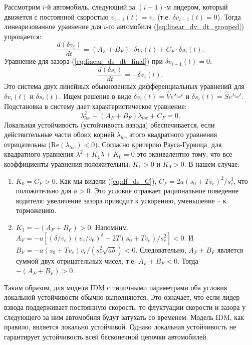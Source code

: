 \documentclass[12pt, a4paper]{article}
\begin{document}
Рассмотрим $i$-й автомобиль, следующий за $(i-1)$-м лидером, который движется с постоянной скоростью $v_{i-1}(t) = v_e$ (т.е. $\delta v_{i-1}(t) = 0$).
Тогда линеаризованное уравнение для $i$-го автомобиля (\ref{eq:linear_dv_dt_grouped}) упрощается:
\begin{equation}
\label{eq:local_dv_dt}
\frac{d(\delta v_i)}{dt} = (A_F + B_F) \cdot \delta v_i(t) + C_F \cdot \delta s_i(t).
\end{equation}
Уравнение для зазора (\ref{eq:linear_ds_dt_final}) при $\delta v_{i-1}(t)=0$:
\begin{equation}
\label{eq:local_ds_dt}
\frac{d(\delta s_i)}{dt} = - \delta v_i(t).
\end{equation}
Это система двух линейных обыкновенных дифференциальных уравнений для $\delta v_i(t)$ и $\delta s_i(t)$.
Ищем решение в виде $\delta v_i(t) = \hat{V} e^{\lambda_{loc} t}$ и $\delta s_i(t) = \hat{S} e^{\lambda_{loc} t}$.
Подстановка в систему дает характеристическое уравнение:
\[ \lambda_{loc}^2 - (A_F + B_F) \lambda_{loc} + C_F = 0. \]
Локальная устойчивость (устойчивость взвода) обеспечивается, если действительные части обоих корней $\lambda_{loc}$ этого квадратного уравнения отрицательны ($\text{Re}(\lambda_{loc}) < 0$). Согласно критерию Рауса-Гурвица, для квадратного уравнения $\lambda^2 + K_1 \lambda + K_0 = 0$ это эквивалентно тому, что все коэффициенты уравнения положительны: $K_1 > 0$ и $K_0 > 0$.
В нашем случае:
\begin{enumerate}
    \item $K_0 = C_F > 0$. Как мы видели (\ref{eq:df_ds_C}), $C_F = 2a (s_0+Tv_e)^2/s_e^3$, что положительно для $a>0$. Это условие отражает рациональное поведение водителя: увеличение зазора приводит к ускорению, уменьшение – к торможению.
    \item $K_1 = -(A_F + B_F) > 0$.
    Напомним, $A_F = -a [ (\delta/v_e)(v_e/v_0)^\delta + 2T(s_0+Tv_e)/s_e^2 ] < 0$.
    И $B_F = -a (s_0+Tv_e)v_e/(s_e^2 \sqrt{ab}) < 0$.
    Следовательно, $A_F + B_F$ является суммой двух отрицательных чисел, т.е. $A_F+B_F < 0$.
    Тогда $-(A_F+B_F) > 0$.
\end{enumerate}
Таким образом, для модели IDM с типичными параметрами оба условия локальной устойчивости обычно выполняются. Это означает, что если лидер взвода поддерживает постоянную скорость, то флуктуации скорости и зазора у следующего за ним автомобиля будут затухать со временем. Модель IDM, как правило, является локально устойчивой.
Однако локальная устойчивость не гарантирует устойчивость всей бесконечной цепочки автомобилей.
\end{document}
